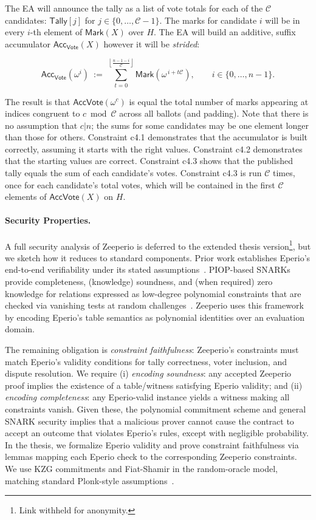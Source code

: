 \noindent The EA will announce the tally as a list of vote totals for each of the $\mathcal{C}$ candidates: $\mathsf{Tally}[j]$ for $j\in\{0,\ldots,\mathcal{C}-1\}$. The marks for candidate $i$ will be in every $i$-th element of $\mathsf{Mark}(X)$ over $H$. The EA will build an additive, suffix accumulator $\mathsf{Acc}_{\mathsf{Vote}}(X)$ however it will be \textit{strided}: 

$$
\mathsf{Acc}_{\mathsf{Vote}}(\omega^i)\ :=\ \sum_{t=0}^{\left\lfloor\frac{n-1-i}{\mathcal{C}}\right\rfloor}\mathsf{Mark}\!\left(\omega^{\,i+t\mathcal{C}}\right),
\qquad i\in\{0,\ldots,n-1\}.
$$

\noindent The result is that $\mathsf{Acc}{\mathsf{Vote}}(\omega^c)$ is equal the total number of marks appearing at indices congruent to $c \bmod \mathcal{C}$ across all ballots (and padding). Note that there is no assumption that $c | n$; the sums for some candidates may be one element longer than those for others. Constraint c4.1 demonstrates that the accumulator is built correctly, assuming it starts with the right values. Constraint c4.2 demonstrates that the starting values are correct. Constraint c4.3 shows that the published tally equals the sum of each candidate's votes. Constraint c4.3 is run $\mathcal{C}$ times, once for each candidate's total votes, which will be contained in the first $\mathcal{C}$ elements of  $\mathsf{Acc}{\mathsf{Vote}}(X)$ on $H$.

\paragraph{Security Properties.}
A full security analysis of Zeeperio is deferred to the extended thesis version\footnote{Link withheld for anonymity.}, but we sketch how it reduces to standard components.
Prior work establishes Eperio’s end-to-end verifiability under its stated assumptions~\cite{ECHA10,BDGR21}.
PIOP-based SNARKs provide completeness, (knowledge) soundness, and (when required) zero knowledge for relations expressed as low-degree polynomial constraints that are checked via vanishing tests at random challenges~\cite{GWC19}.
Zeeperio uses this framework by encoding Eperio’s table semantics as polynomial identities over an evaluation domain.

The remaining obligation is \emph{constraint faithfulness}: Zeeperio’s constraints must match Eperio’s validity conditions for tally correctness, voter inclusion, and dispute resolution.
We require (i) \emph{encoding soundness}: any accepted Zeeperio proof implies the existence of a table/witness satisfying Eperio validity; and (ii) \emph{encoding completeness}: any Eperio-valid instance yields a witness making all constraints vanish.
Given these, the polynomial commitment scheme and general SNARK security implies that a malicious prover cannot cause the contract to accept an outcome that violates Eperio’s rules, except with negligible probability.
In the thesis, we formalize Eperio validity and prove constraint faithfulness via lemmas mapping each Eperio check to the corresponding Zeeperio constraints.
We use KZG commitments and Fiat-Shamir in the random-oracle model, matching standard Plonk-style assumptions~\cite{GWC19,KZG10}.%

